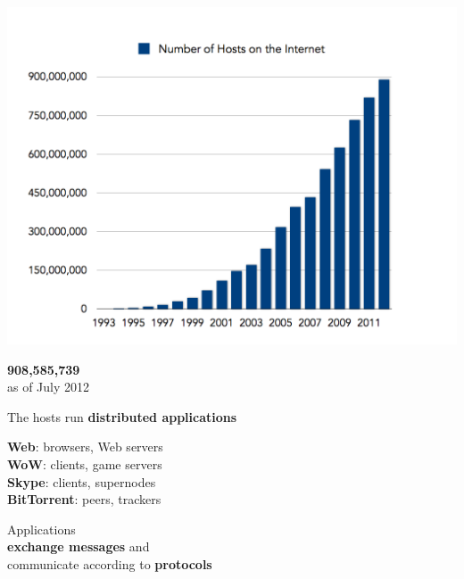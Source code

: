 \documentclass[20pt,handout,notes=show]{beamer}
\begin{document}
\begin{frame}[plain]\begin{center}\large
		\includegraphics[width=\linewidth]{figures/num-of-hosts-chart.png}
\end{center}\end{frame}

\begin{frame}
\begin{center}
\Huge
\textbf{908,585,739}\\
\large
as of July 2012
\end{center}
\end{frame}

\begin{frame}\begin{center}
\large
The hosts run \textbf{distributed applications}
\end{center}\end{frame}

\begin{frame}
\large
\textbf{Web}: browsers, Web servers\\
\textbf{WoW}: clients, game servers\\
\textbf{Skype}: clients, supernodes\\
\textbf{BitTorrent}: peers, trackers\\
\end{frame}

\begin{frame}
\begin{center}
\large
Applications\\\textbf{exchange messages} and\\ communicate according to \textbf{protocols}
\end{center}
\end{frame}
\end{document}
